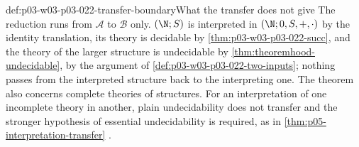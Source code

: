 \begin{hbwarning}{def:p03-w03-p03-022-transfer-boundary}{What the transfer does not give}
The reduction runs from \(\mathcal A\) to \(\mathcal B\) only.
\((\N;S)\) is interpreted in \((\N;0,S,+,\cdot)\) by the identity
translation, its theory is decidable by \cref{thm:p03-w03-p03-022-succ},
and the theory of the larger structure is undecidable by
\cref{thm:theoremhood-undecidable}, by the argument of
\cref{def:p03-w03-p03-022-two-inputs}; nothing passes from the interpreted
structure back to the interpreting one. The theorem also concerns complete
theories of structures. For an interpretation of one incomplete theory in
another, plain undecidability does not transfer and the stronger
hypothesis of essential undecidability is required, as in
\cref{thm:p05-interpretation-transfer} \cite{TMR1953}.
\end{hbwarning}
